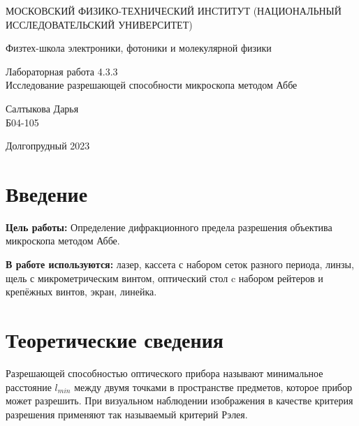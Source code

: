 \documentclass[a4paper,12pt]{article} %
\begin{document}
	
	\begin{titlepage}
	\begin{center}
		{\large МОСКОВСКИЙ ФИЗИКО-ТЕХНИЧЕСКИЙ ИНСТИТУТ (НАЦИОНАЛЬНЫЙ ИССЛЕДОВАТЕЛЬСКИЙ УНИВЕРСИТЕТ)}
	\end{center}
	\begin{center}
		{\large Физтех-школа электроники, фотоники и молекулярной физики}
	\end{center}
	
	
	\vspace{4.5cm}
	{\huge
		\begin{center}
			{Лабораторная работа 4.3.3}\\
			Исследование разрешающей способности микроскопа методом Аббе
		\end{center}
	}
	\vspace{2cm}
	\begin{flushright}
		{\LARGE Салтыкова Дарья \\
			\vspace{0.5cm}
			Б04-105}
	\end{flushright}
	\vspace{8cm}
	\begin{center}
		Долгопрудный 2023
	\end{center}
\end{titlepage}

\section{Введение}

\noindent \textbf{Цель работы:} Определение дифракционного предела разрешения
объектива микроскопа методом Аббе.

\medskip

\noindent \textbf{В работе используются:} лазер, кассета с набором сеток разного
периода, линзы, щель с микрометрическим винтом, оптический стол
c набором рейтеров и крепёжных винтов, экран, линейка.


\section{Теоретические сведения}
\noindent Разрешающей способностью оптического прибора называют минимальное расстояние $l_{min}$ между двумя точками в пространстве предметов, которое прибор может разрешить. При визуальном наблюдении изображения в качестве критерия разрешения применяют так называемый критерий Рэлея. 

\medskip
\end{document}
